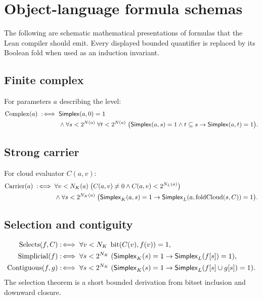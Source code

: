 
\section{Object-language formula schemas}
\label{app:schemas}

The following are schematic mathematical presentations of formulas that the Lean compiler should emit.  Every displayed bounded quantifier is replaced by its Boolean fold when used as an induction invariant.

\subsection{Finite complex}

For parameters $a$ describing the level:
\begin{align*}
\operatorname{Complex}(a)\;:\!\iff\;&
\mathsf{Simplex}(a,0)=1\\
&\wedge
\forall s<2^{N(a)}\;\forall t<2^{N(a)}\;\bigl(
  \mathsf{Simplex}(a,s)=1\wedge t\subseteq s
  \to \mathsf{Simplex}(a,t)=1\bigr).
\end{align*}

\subsection{Strong carrier}

For cloud evaluator $C(a,v)$:
\begin{align*}
\operatorname{Carrier}(a)\;:\!\iff\;&
\forall v<N_K(a)\;\bigl(C(a,v)\neq0\wedge C(a,v)<2^{N_L(a)}\bigr)\\
&\wedge
\forall s<2^{N_K(a)}\;\bigl(
\mathsf{Simplex}_K(a,s)=1\to
\mathsf{Simplex}_L(a,\operatorname{foldCloud}(s,C))=1\bigr).
\end{align*}

\subsection{Selection and contiguity}

\begin{align*}
\operatorname{Selects}(f,C)&:\!\iff
  \forall v<N_K\;\operatorname{bit}(C(v),f(v))=1,\\
\operatorname{Simplicial}(f)&:\!\iff
  \forall s<2^{N_K}\;(
  \mathsf{Simplex}_K(s)=1\to\mathsf{Simplex}_L(f[s])=1),\\
\operatorname{Contiguous}(f,g)&:\!\iff
  \forall s<2^{N_K}\;(
  \mathsf{Simplex}_K(s)=1\to\mathsf{Simplex}_L(f[s]\cup g[s])=1).
\end{align*}
The selection theorem is a short bounded derivation from bitset inclusion and downward closure.

